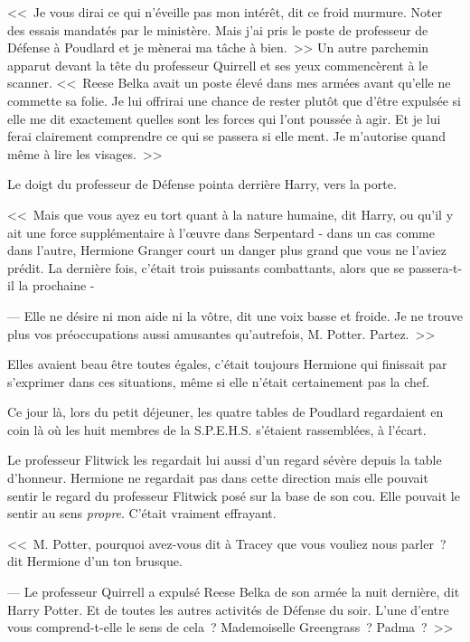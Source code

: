 <<~Je vous dirai ce qui n'éveille pas mon intérêt, dit ce froid murmure. Noter des essais mandatés par le ministère. Mais j'ai pris le poste de professeur de Défense à Poudlard et je mènerai ma tâche à bien.~>> Un autre parchemin apparut devant la tête du professeur Quirrell et ses yeux commencèrent à le scanner. <<~Reese Belka avait un poste élevé dans mes armées avant qu'elle ne commette sa folie. Je lui offrirai une chance de rester plutôt que d'être expulsée si elle me dit exactement quelles sont les forces qui l'ont poussée à agir. Et je lui ferai clairement comprendre ce qui se passera si elle ment. Je m'autorise quand même à lire les visages.~>>

Le doigt du professeur de Défense pointa derrière Harry, vers la porte.

<<~Mais que vous ayez eu tort quant à la nature humaine, dit Harry, ou qu'il y ait une force supplémentaire à l'œuvre dans Serpentard - dans un cas comme dans l'autre, Hermione Granger court un danger plus grand que vous ne l'aviez prédit. La dernière fois, c'était trois puissants combattants, alors que se passera-t-il la prochaine -

--- Elle ne désire ni mon aide ni la vôtre, dit une voix basse et froide. Je ne trouve plus vos préoccupations aussi amusantes qu'autrefois, M. Potter. Partez.~>>

\later

Elles avaient beau être toutes égales, c'était toujours Hermione qui finissait par s'exprimer dans ces situations, même si elle n'était certainement pas la chef.

Ce jour là, lors du petit déjeuner, les quatre tables de Poudlard regardaient en coin là où les huit membres de la S.P.E.H.S. s'étaient rassemblées, à l'écart.

Le professeur Flitwick les regardait lui aussi d'un regard sévère depuis la table d'honneur. Hermione ne regardait pas dans cette direction mais elle pouvait sentir le regard du professeur Flitwick posé sur la base de son cou. Elle pouvait le sentir au sens \emph{propre}. C'était vraiment effrayant.

<<~M. Potter, pourquoi avez-vous dit à Tracey que vous vouliez nous parler~? dit Hermione d'un ton brusque.

--- Le professeur Quirrell a expulsé Reese Belka de son armée la nuit dernière, dit Harry Potter. Et de toutes les autres activités de Défense du soir. L'une d'entre vous comprend-t-elle le sens de cela~? Mademoiselle Greengrass~? Padma~?~>>

